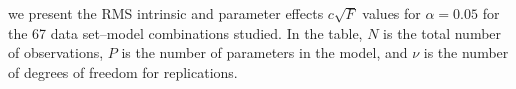 \begin{table}
\begin{tabular}{c c c c c c c c c}
\end{tabular}
\end{table}
we present the RMS intrinsic and parameter effects
$c \sqrt F$ values for $\alpha = 0.05$ for the
67 data set--model combinations studied.
In the table,
$N$ is the total number of observations, $P$ is the number
of parameters in the model, and $\nu$ is the number of degrees of
freedom for replications.

